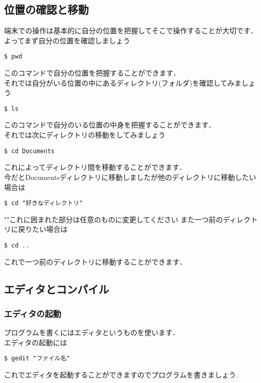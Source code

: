 \documentclass[a4j,titlepage,dvipdfmx]{jsarticle}   %
\begin{document}
\subsection{位置の確認と移動}
端末での操作は基本的に自分の位置を把握してそこで操作することが大切です．\\
よってまず自分の位置を確認しましょう\\
\begin{lstlisting}
$ pwd
\end{lstlisting}

このコマンドで自分の位置を把握することができます．\\
それでは自分がいる位置の中にあるディレクトリ(フォルダ)を確認してみましょう\\
\begin{lstlisting}
$ ls
\end{lstlisting}
このコマンドで自分のいる位置の中身を把握することができます．\\
それでは次にディレクトリの移動をしてみましょう
\begin{lstlisting}
$ cd Documents
\end{lstlisting}

これによってディレクトリ間を移動することができます．\\
今だとDocumentsディレクトリに移動しましたが他のディレクトリに移動したい場合は
\begin{lstlisting}
$ cd "好きなディレクトリ"
\end{lstlisting}
""これに囲まれた部分は任意のものに変更してください
また一つ前のディレクトリに戻りたい場合は
\begin{lstlisting}
$ cd ..
\end{lstlisting}

これで一つ前のディレクトリに移動することができます．

\subsection{エディタとコンパイル}
\subsubsection{エディタの起動}
プログラムを書くにはエディタというものを使います．\\
エディタの起動には

\begin{lstlisting}
$ gedit "ファイル名"
\end{lstlisting}
これでエディタを起動することができますのでプログラムを書きましょう.\\
\end{document}
